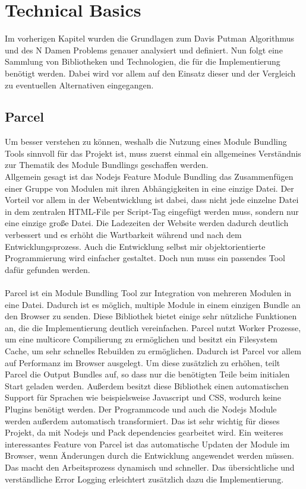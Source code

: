 

\chapter{Technical Basics}
Im vorherigen Kapitel wurden die Grundlagen zum Davis Putman Algorithmus und des N Damen Problems genauer analysiert und definiert. Nun folgt eine Sammlung von Bibliotheken und Technologien, die für die Implementierung benötigt werden. Dabei wird vor allem auf den Einsatz dieser und der Vergleich zu eventuellen Alternativen eingegangen. 

\section{Parcel}
Um besser verstehen zu können, weshalb die Nutzung eines Module Bundling Tools sinnvoll für das Projekt ist, muss zuerst einmal ein allgemeines Verständnis zur Thematik des Module Bundlings geschaffen werden.
\\
Allgemein gesagt ist das Nodejs Feature Module Bundling das Zusammenfügen einer Gruppe von Modulen mit ihren Abhängigkeiten in eine einzige Datei. Der Vorteil vor allem in der Webentwicklung ist dabei, dass nicht jede einzelne Datei in dem zentralen HTML-File per Script-Tag eingefügt werden muss, sondern nur eine einzige große Datei. Die Ladezeiten der Website werden dadurch deutlich verbessert und es erhöht die Wartbarkeit während und nach dem Entwicklungsprozess. Auch die Entwicklung selbst mir objektorientierte  Programmierung wird einfacher gestaltet. Doch nun muss ein passendes Tool dafür gefunden werden. 
\\ 
\\
Parcel ist ein Module Bundling Tool zur Integration von mehreren Modulen in eine Datei. Dadurch ist es möglich, multiple Module in einem einzigen Bundle an den Browser zu senden. Diese Bibliothek bietet einige sehr nützliche Funktionen an, die die Implementierung deutlich vereinfachen. Parcel nutzt Worker Prozesse, um eine multicore Compilierung zu ermöglichen und besitzt ein Filesystem Cache, um sehr schnelles Rebuilden zu ermöglichen. Dadurch ist Parcel vor allem auf Performanz im Browser ausgelegt. Um diese zusätzlich zu erhöhen, teilt Parcel die Output Bundles auf, so dass nur die benötigten Teile beim initialen Start geladen werden. Außerdem besitzt diese Bibliothek einen automatischen Support für Sprachen wie beispielsweise Javascript und CSS, wodurch keine Plugins benötigt werden. Der Programmcode und auch die Nodejs Module werden außerdem automatisch transformiert. Das ist sehr wichtig für dieses Projekt, da mit Nodejs und Pack dependencies gearbeitet wird. Ein weiteres interessantes Feature von Parcel ist das automatische Updaten der Module im Browser, wenn Änderungen durch die Entwicklung angewendet werden müssen. Das macht den Arbeitsprozess dynamisch und schneller. Das übersichtliche und verständliche Error Logging erleichtert zusätzlich dazu die Implementierung. 
